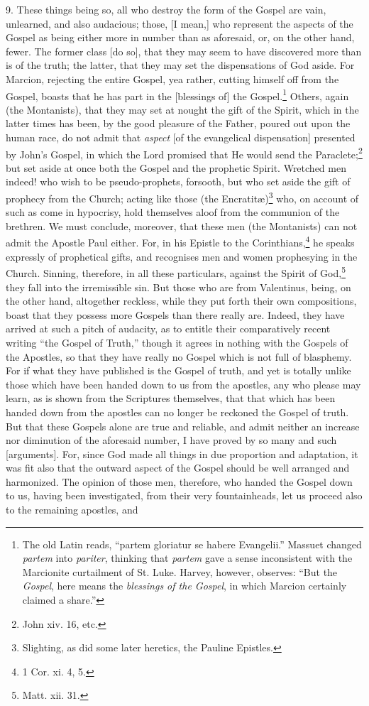 9. These things being so, all who destroy the form of the Gospel are vain, unlearned, and also audacious; those, [I mean,] who represent the aspects of the Gospel as being either more in number than as aforesaid, or, on the other hand, fewer. The former class [do so], that they may seem to have discovered more than is of the truth; the latter, that they may set the dispensations of God aside. For Marcion, rejecting the entire Gospel, yea rather, cutting himself off from the Gospel, boasts that he has part in the [blessings of] the Gospel.\footnote{The old Latin reads, “partem gloriatur se habere Evangelii.” Massuet changed \emph{partem} into \emph{pariter}, thinking that \emph{partem} gave a sense inconsistent with the Marcionite curtailment of St. Luke. Harvey, however, observes: “But the \emph{Gospel}, here means the \emph{blessings of the Gospel}, in which Marcion certainly claimed a share.”} Others, again (the Montanists), that they may set at nought the gift of the Spirit, which in the latter times has been, by the good pleasure of the Father, poured out upon the human race, do not admit that \emph{aspect} [of the evangelical dispensation] presented by John’s Gospel, in which the Lord promised that He would send the Paraclete;\footnote{John xiv. 16, etc.} but set aside at once both the Gospel and the prophetic Spirit. Wretched men indeed! who wish to be pseudo-prophets, forsooth, but who set aside the gift of prophecy from the Church; acting like those (the Encratitæ)\footnote{Slighting, as did some later heretics, the Pauline Epistles.} who, on account of such as come in hypocrisy, hold themselves aloof from the communion of the brethren. We must conclude, moreover, that these men (the Montanists) can not admit the Apostle Paul either. For, in his Epistle to the Corinthians,\footnote{1 Cor. xi. 4, 5.} he speaks expressly of prophetical gifts, and recognises men and women prophesying in the Church. Sinning, therefore, in all these particulars, against the Spirit of God,\footnote{Matt. xii. 31.} they fall into the irremissible sin. But those who are from Valentinus, being, on the other hand, altogether reckless, while they put forth their own compositions, boast that they possess more Gospels than there really are. Indeed, they have arrived at such a pitch of audacity, as to entitle their comparatively recent writing “the Gospel of Truth,” though it agrees in nothing with the Gospels of the Apostles, so that they have really no Gospel which is not full of blasphemy. For if what they have published is the Gospel of truth, and yet is totally unlike those which have been handed down to us from the apostles, any who please may learn, as is shown from the Scriptures themselves, that that which has been handed down from the apostles can no longer be reckoned the Gospel of truth. But that these Gospels alone are true and reliable, and admit neither an increase nor diminution of the aforesaid number, I have proved by so many and such [arguments]. For, since God made all things in due proportion and adaptation, it was fit also that the outward aspect of the Gospel should be well arranged and harmonized. The opinion of those men, therefore, who handed the Gospel down to us, having been investigated, from their very fountainheads, let us proceed also to the remaining apostles, and 